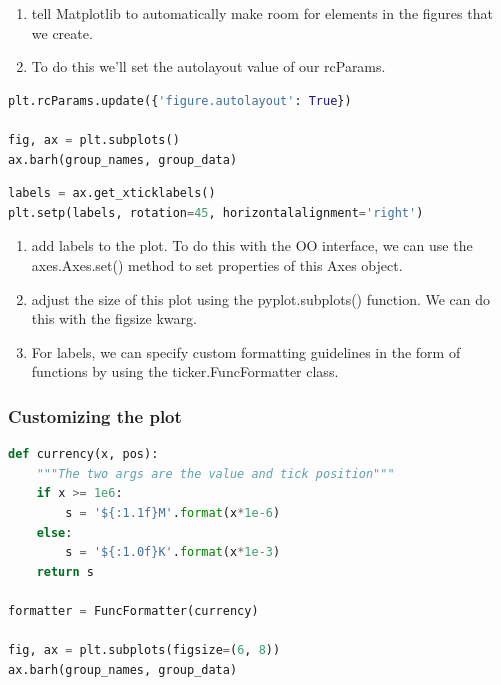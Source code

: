 \documentclass[UTF8,a4paper,12pt]{ctexart}  %
\providecommand{\tightlist}{\setlength{\itemsep}{0pt}\setlength{\parskip}{0pt}}
\begin{document}
\begin{enumerate}
\def\labelenumi{\arabic{enumi}.}
\tightlist
\item
  tell Matplotlib to automatically make room for elements in the
  figures that we create.
\item
  To do this we'll set the autolayout value of our rcParams.
\end{enumerate}

\begin{lstlisting}[language=Python]
plt.rcParams.update({'figure.autolayout': True})

fig, ax = plt.subplots()
ax.barh(group_names, group_data)
\end{lstlisting}

\begin{lstlisting}[language=Python]
labels = ax.get_xticklabels()
plt.setp(labels, rotation=45, horizontalalignment='right')
\end{lstlisting}

\begin{enumerate}
\def\labelenumi{\arabic{enumi}.}
\tightlist
\item
  add labels to the plot. To do this with the OO interface, we can use
  the axes.Axes.set() method to set properties of this Axes object.
\item
  adjust the size of this plot using the pyplot.subplots() function.
  We can do this with the figsize kwarg.
\item
  For labels, we can specify custom formatting guidelines in the form
  of functions by using the ticker.FuncFormatter class.
\end{enumerate}

\hypertarget{customizing-the-plot-2}{%
\subsubsection{Customizing the plot}\label{customizing-the-plot-2}}

\begin{lstlisting}[language=Python]
def currency(x, pos):
    """The two args are the value and tick position"""
    if x >= 1e6:
        s = '${:1.1f}M'.format(x*1e-6)
    else:
        s = '${:1.0f}K'.format(x*1e-3)
    return s

formatter = FuncFormatter(currency)

fig, ax = plt.subplots(figsize=(6, 8))
ax.barh(group_names, group_data)
\end{lstlisting}
\end{document}
